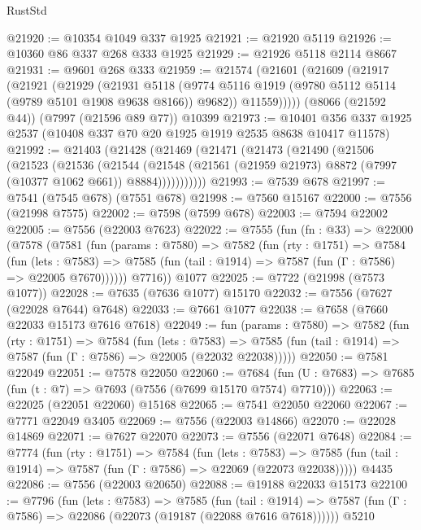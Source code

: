 \begin{lexlean}{RustStd}
\begin{coremodule}
@21920 := @10354 @1049 @337 @1925
@21921 := @21920 @5119
@21926 := @10360 @86 @337 @268 @333 @1925
@21929 := @21926 @5118 @2114 @8667
@21931 := @9601 @268 @333
@21959 := @21574
    (@21601
      (@21609
        (@21917
          (@21921
            (@21929
              (@21931
                @5118
                (@9774 @5116 @1919 (@9780 @5112 @5114 (@9789 @5101 @1908 @9638 @8166)) @9682))
              @11559)))))
    (@8066 (@21592 @44))
    (@7997 (@21596 @89 @77))
    @10399
@21973 := @10401 @356 @337 @1925 @2537 (@10408 @337 @70 @20 @1925 @1919 @2535 @8638 @10417 @11578)
@21992 := @21403
    (@21428
      (@21469
        (@21471
          (@21473
            (@21490
              (@21506
                (@21523
                  (@21536
                    (@21544
                      (@21548
                        (@21561 (@21959 @21973) @8872 (@7997 (@10377 @1062 @661)) @8884)))))))))))
@21993 := @7539 @678
@21997 := @7541 (@7545 @678) (@7551 @678)
@21998 := @7560 @15167
@22000 := @7556 (@21998 @7575)
@22002 := @7598 (@7599 @678)
@22003 := @7594 @22002
@22005 := @7556 (@22003 @7623)
@22022 := @7555
    (fun (fn : @33) =>
    @22000
      (@7578
        (@7581
          (fun (params : @7580) =>
          @7582
            (fun (rty : @1751) =>
            @7584
              (fun (lets : @7583) =>
              @7585 (fun (tail : @1914) => @7587 (fun (Γ : @7586) => @22005 @7670))))))
        @7716))
    @1077
@22025 := @7722 (@21998 (@7573 @1077))
@22028 := @7635 (@7636 @1077) @15170
@22032 := @7556 (@7627 (@22028 @7644) @7648)
@22033 := @7661 @1077
@22038 := @7658 (@7660 @22033 @15173 @7616 @7618)
@22049 := fun (params : @7580) =>
  @7582
    (fun (rty : @1751) =>
    @7584
      (fun (lets : @7583) =>
      @7585 (fun (tail : @1914) => @7587 (fun (Γ : @7586) => @22005 (@22032 @22038)))))
@22050 := @7581 @22049
@22051 := @7578 @22050
@22060 := @7684
    (fun (U : @7683) => @7685 (fun (t : @7) => @7693 (@7556 (@7699 @15170 @7574) @7710)))
@22063 := @22025 (@22051 @22060) @15168
@22065 := @7541 @22050 @22060
@22067 := @7771 @22049 @3405
@22069 := @7556 (@22003 @14866)
@22070 := @22028 @14869
@22071 := @7627 @22070
@22073 := @7556 (@22071 @7648)
@22084 := @7774
    (fun (rty : @1751) =>
    @7584
      (fun (lets : @7583) =>
      @7585 (fun (tail : @1914) => @7587 (fun (Γ : @7586) => @22069 (@22073 @22038)))))
    @4435
@22086 := @7556 (@22003 @20650)
@22088 := @19188 @22033 @15173
@22100 := @7796
    (fun (lets : @7583) =>
    @7585
      (fun (tail : @1914) =>
      @7587 (fun (Γ : @7586) => @22086 (@22073 (@19187 (@22088 @7616 @7618))))))
    @5210

\end{coremodule}
\end{lexlean}
